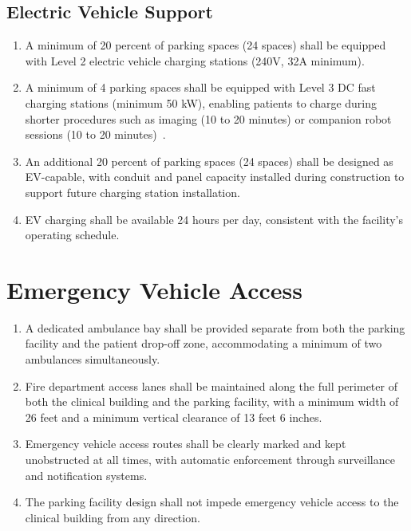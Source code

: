 \subsection{Electric Vehicle Support}

\begin{enumerate}[label=(\alph*)]
\item A minimum of 20 percent of parking spaces (24 spaces) shall be equipped
  with Level 2 electric vehicle charging stations (240V, 32A minimum).

\item A minimum of 4 parking spaces shall be equipped with Level 3 DC fast
  charging stations (minimum 50 kW), enabling patients to charge during shorter
  procedures such as imaging (10 to 20 minutes) or companion robot sessions
  (10 to 20 minutes)~\cite{patientinstructions2026}.

\item An additional 20 percent of parking spaces (24 spaces) shall be designed
  as EV-capable, with conduit and panel capacity installed during construction
  to support future charging station installation.

\item EV charging shall be available 24 hours per day, consistent with the
  facility's operating schedule.
\end{enumerate}

\section{Emergency Vehicle Access}

\begin{enumerate}[label=(\alph*)]
\item A dedicated ambulance bay shall be provided separate from both the parking
  facility and the patient drop-off zone, accommodating a minimum of two
  ambulances simultaneously.

\item Fire department access lanes shall be maintained along the full perimeter
  of both the clinical building and the parking facility, with a minimum width
  of 26 feet and a minimum vertical clearance of 13 feet 6 inches.

\item Emergency vehicle access routes shall be clearly marked and kept
  unobstructed at all times, with automatic enforcement through surveillance
  and notification systems.

\item The parking facility design shall not impede emergency vehicle access to
  the clinical building from any direction.
\end{enumerate}

